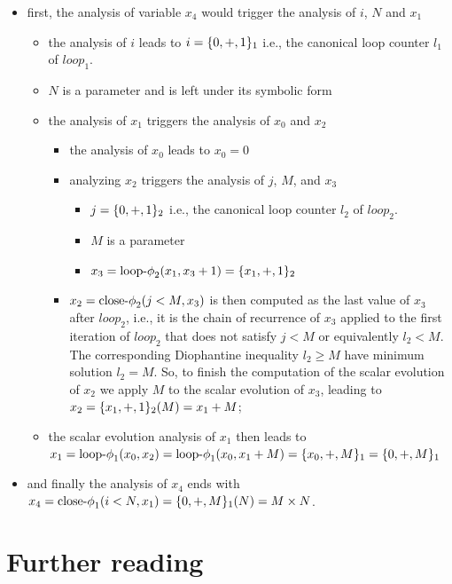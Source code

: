\begin{itemize}
\item first, the analysis of variable $x_4$ would trigger the analysis
  of $i$, $N$ and $x_1$
  \begin{itemize}
  \item the analysis of $i$ leads to $i = \{0, +, 1\}_1$ i.e., the canonical loop counter $l_1$ of $loop_1$.
  \item $N$ is a parameter and is left under its symbolic form
  \item the analysis of $x_1$ triggers the analysis of $x_0$ and $x_2$
    \begin{itemize}
    \item the analysis of $x_0$ leads to $x_0 = 0$
    \item analyzing $x_2$ triggers the analysis of $j$, $M$, and $x_3$
      \begin{itemize}
      \item $j = \{0, +, 1\}_2$ i.e., the canonical loop counter $l_2$ of $loop_2$.
      \item $M$ is a parameter
      \item $x_3 = \textrm{loop-$\phi$}_2 (x_1, x_3 + 1) = \{x_1, +, 1\}_2$
      \end{itemize}
    \item $x_2 = \textrm{close-$\phi$}_2 (j < M, x_3)$ is then computed as the last value of $x_3$ after
      $loop_2$, i.e., it is the chain of recurrence of $x_3$ applied
      to the first iteration of $loop_2$ that does not satisfy $j < M$ or equivalently $l_2<M$. The corresponding Diophantine inequality $l_2\geq M$  have minimum solution $l_2=M$. So, to finish the computation of the scalar evolution of
      $x_2$ we apply $M$ to the scalar evolution of $x_3$, leading
      to $x_2 = \{x_1, +, 1\}_2 (M) = x_1 + M$;
    \end{itemize}
  \item the scalar evolution analysis of $x_1$ then leads to $x_1 =
    \textrm{loop-$\phi$}_1 (x_0, x_2) = \textrm{loop-$\phi$}_1 (x_0, x_1 + M) = \{x_0, +, M\}_1 =
    \{0, +, M\}_1$
  \end{itemize}
\item and finally the analysis of $x_4$ ends with $x_4 = \textrm{close-$\phi$}_1 (i
  < N, x_1) = \{0, +, M\}_1 (N) = M \times N$.
\end{itemize}


\section{Further reading}

